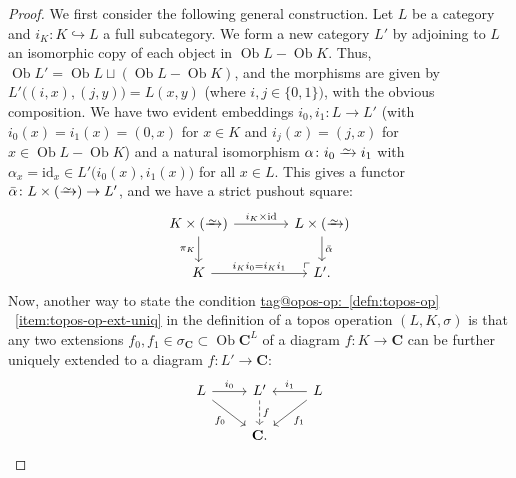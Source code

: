 \documentclass{amsart}
\makeatletter
\newcommand\bC{\mathbf{C}}
\newcommand\hto{\hookrightarrow}
\newcommand\id{\mathrm{id}}
\newcommand\Ob{\operatorname{Ob}}
\newcommand\pbig[1]{\big({#1}\big)}
\newcommand\po[1][lu]{\ar[#1, phantom, "\ulcorner", pos=0]}
\newcommand\set[2][]{#1\{ #2 #1\}}
\newcommand\toi{\xrightarrow{\raisebox{-2.5pt}[0pt][0pt]{\ensuremath{\scriptstyle{\sim}}}}}
\newcommand\tagword[1]{\csname tag@#1\endcsname}
\def\label@tag#1:#2\@nil{#1}
\newcommand\labeltag[1]{\label@tag#1:\@nil}
\newcommand\jref[1]{%
  \texorpdfstring%
    {\hyperref[#1]{\tagword{\labeltag{#1}}~\ref*{#1}}}%
    {\tagword{\labeltag{#1}}~\ref*{#1}}%
}
\theoremstyle{definition}
\theoremstyle{remark}
\theoremstyle{plainwithref}
\makeatother
\begin{document}
\begin{proof}
  We first consider the following general construction.
  Let \( L \) be a category and \( i_K \colon K \hto L \) a full subcategory.
  We form a new category \( L' \) by adjoining to \( L \) an isomorphic copy of each object in \( \Ob L - \Ob K \).
  Thus, \( \Ob L' = \Ob L \sqcup (\Ob L - \Ob K) \), and the morphisms are given by \( L'\pbig{(i, x), (j, y)} = L(x, y) \) (where \( i,j \in \set{0,1}) \), with the obvious composition.
  We have two evident embeddings \( i_0,i_1 \colon L \to L' \) (with \( i_0(x) = i_1(x) = (0, x) \) for \( x \in K \) and \( i_j(x) = (j, x) \) for \( x \in \Ob L - \Ob K \)) and a natural isomorphism \( \alpha \colon i_0 \toi i_1 \) with \( \alpha_x = \id_x \in L'\pbig{i_0(x), i_1(x)} \) for all \( x \in L \).
  This gives a functor \( \bar \alpha \colon L \times ( \toi ) \to L' \), and we have a strict pushout square:
  \[
    \begin{tikzcd}
      K \times (\toi) \ar[r, "i_K \times \id"] \ar[d, "\pi_K"'] &[15pt] L \times ( \toi ) \ar[d, "\bar \alpha"]
      \\
      K \ar[r, "i_K i_0 = i_K i_1"] & L'. \po
    \end{tikzcd}
  \]
  Now, another way to state the condition \jref{defn:topos-op}~\ref{item:topos-op-ext-uniq} in the definition of a topos operation \( (L, K, \sigma) \) is that any two extensions \( f_0,f_1 \in \sigma_{\bC} \subset \Ob \bC^L \) of a diagram \( f \colon K \to \bC \) can be further uniquely extended to a diagram \( f \colon L' \to \bC \):
  \begin{equation} \label{eq:doubled-diag-uniq-ext}
    \begin{tikzcd}
      L \ar[rd, "f_0"'] \ar[r, "i_0"] & L' \ar[d, "f", dashed]  & L \ar[ld, "f_1"] \ar[l, "i_1"'] \\
      & \bC. &
    \end{tikzcd}
  \end{equation}


\end{proof}
\end{document}
